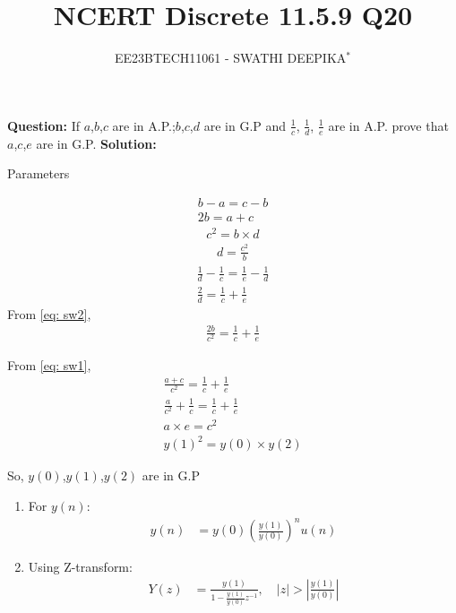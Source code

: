 \documentclass[journal,12pt,twocolumn]{IEEEtran}
\title{
	
\title{NCERT Discrete 11.5.9 Q20}
\author{EE23BTECH11061 - SWATHI DEEPIKA$^{*}$%
}


}
\theoremstyle{remark}
\newcommand{\solution}{\noindent \textbf{Solution: }}
\begin{document}
\maketitle

\textbf{Question:} 
If $a$,$b$,$c$ are in A.P.;$b$,$c$,$d$ are in G.P and $\frac{1}{c}$, $\frac{1}{d}$, $\frac{1}{e}$ are in A.P. prove that $a$,$c$,$e$ are in G.P.
\solution
 \begin{table}[h]
 	\centering
 	\resizebox{6 cm}{!}{
 		
 	}
 	\vspace{6 pt}
 	\caption{Parameters}
 	\label{tab:swa_tabel} 
 \end{table}

 
\begin{align}
b-a = c-b\\
2b=a+c \label{eq: sw1}
\end{align}
\begin{align}
c^2 = b\times d
\end{align}
\begin{align}
d= \frac{c^2}{b} \label{eq: sw2}
\end{align}
\begin{align}
\frac{1}{d} - \frac{1}{c} = \frac{1}{e} - \frac{1}{d}\\
\frac{2}{d} = \frac{1}{c} + \frac{1}{e}
\end{align}
From \eqref{eq: sw2},
\begin{align}
\frac{2b}{c^2} = \frac{1}{c} + \frac{1}{e}
\end{align}

From \eqref{eq: sw1},
\begin{align}\frac{a + c}{c^2} = \frac{1}{c} + \frac{1}{e}\\
\frac{a}{c^2} + \frac{1}{c} = \frac{1}{c} + \frac{1}{e}\\
a \times e = {c}^2\\
{y(1)}^2 = y(0) \times y(2)
\end{align}

So, $y(0)$,$y(1)$,$y(2)$ are in G.P\\

\begin{enumerate}

\item For $y(n)$:
    \begin{align}
        y(n) &= y(0)\left(\frac{y(1)}{y(0)}\right)^n u(n)
    \end{align}
    \item Using Z-transform:
    \begin{align}
        Y(z) &= \frac{y(1)}{1-\frac{y(1)}{y(0)}z^{-1}}, \quad \left|z\right|>\left|\frac{y(1)}{y(0)}\right|
    \end{align}
    
\end{enumerate}
\end{document}
